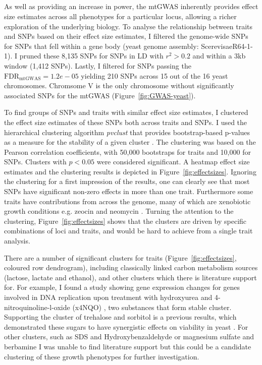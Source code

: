 \subsection{}
As well as providing an increase in power, the mtGWAS inherently provides effect size estimates across all phenotypes for a particular locus, allowing a richer exploration of the underlying biology. 
To analyse the relationship between traits and SNPs based on their effect size estimates, I filtered the genome-wide SNPs for SNPs that fell within a gene body (yeast genome assembly: ScerevisaeR64-1-1).  I pruned these 8,135 SNPs for SNPs in LD  with \(r^2 > 0.2\) and within a 3kb window (1,412 SNPs). Lastly, I filtered for SNPs passing the \(\text{FDR}_\text{mtGWAS} =1.2e-05\) yielding 210 SNPs across 15 out of the 16 yeast chromosomes. Chromsome V is the only chromosome without significantly associated SNPs for the mtGWAS (Figure~\ref{fig:GWAS-yeast}). 

To find groups of SNPs and traits with similar effect size estimates, I clustered the effect size estimates of these SNPs both across traits and SNPs. I used the hierarchical clustering algorithm \textit{pvclust} that provides bootstrap-based p-values as a measure for the stability of a given cluster \cite{Suzuki2006}. The clustering was based on the Pearson correlation coefficients, with 50,000 bootstraps for traits and 10,000 for SNPs. Clusters with \(p < 0.05\) were considered significant. A heatmap effect size estimates and the clustering results is depicted in Figure~\ref{fig:effectsizes}. Ignoring the clustering for a first impression of the results, one can clearly see that most SNPs have significant non-zero effects in more than one trait. Furthermore some traits have contributions from across the genome, many of which are xenobiotic growth conditions e.g. zeocin \cite{Krol2015} and neomycin \cite{Alamgir2010}. Turning the attention to the clustering,  Figure~\ref{fig:effectsizes} shows that the clusters are driven by specific combinations of loci and traits, and would be hard to achieve from a single trait analysis. 

There are a number of significant clusters for traits (Figure~\ref{fig:effectsizes}, coloured row dendrogram), including classically linked carbon metabolism sources (lactose, lactate and ethanol), and other clusters which there is literature support for. For example, I found a study showing gene expression changes for genes involved in DNA replication upon treatment with hydroxyurea and 4-nitroquinoline-l-oxide (x4NQO) \cite{Elledge1990}, two substances that form stable cluster. Supporting the cluster of trehalose and sorbitol is a previous results, which demonstrated these sugars to have synergistic effects on viability in yeast \cite{Hua2015}. For other clusters, such as SDS and Hydroxybenzaldehyde or magnesium sulfate and berbamine I was unable to find literature support but this could be a candidate clustering of these growth phenotypes for further investigation. 

